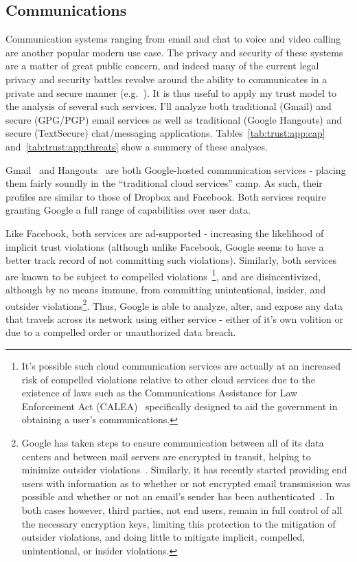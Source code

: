 \subsection{Communications}

Communication systems ranging from email and chat to voice and video
calling are another popular modern use case. The privacy and security
of these systems are a matter of great public concern, and indeed many
of the current legal privacy and security battles revolve around the
ability to communicates in a private and secure manner
(e.g.~\cite{apple-fbiletter, greenwald-prism, levsion-lavabit}). It is
thus useful to apply my trust model to the analysis of several such
services. I'll analyze both traditional (Gmail) and secure (GPG/PGP)
email services as well as traditional (Google Hangouts) and secure
(TextSecure) chat/messaging
applications. Tables~\ref{tab:trust:app:cap}
and~\ref{tab:trust:app:threats} show a summery of these analyses.

Gmail~\cite{google-gmail} and Hangouts~\cite{google-hangouts} are both
Google-hosted communication services - placing them fairly soundly in
the ``traditional cloud services'' camp. As such, their profiles are
similar to those of Dropbox and Facebook. Both services require
granting Google a full range of capabilities over user data.

Like Facebook, both services are ad-supported - increasing the
likelihood of implicit trust violations (although unlike Facebook,
Google seems to have a better track record of not committing such
violations). Similarly, both services are known to be subject to
compelled violations~\cite{google-transparency}\footnote{It's possible
  such cloud communication services are actually at an increased risk
  of compelled violations relative to other cloud services due to the
  existence of laws such as the Communications Assistance for Law
  Enforcement Act (CALEA)~\cite{calea-usc, calea-fcc} specifically
  designed to aid the government in obtaining a user's
  communications.}, and are disincentivized, although by no means
immune, from committing unintentional, insider, and outsider
violations\footnote{Google has taken steps to ensure communication
  between all of its data centers and between mail servers are
  encrypted in transit, helping to minimize outsider
  violations~\cite{gmail-blog-encryption}. Similarly, it has recently
  started providing end users with information as to whether or not
  encrypted email transmission was possible and whether or not an
  email's sender has been authenticated~\cite{gmail-blog-indicators}.
  In both cases however, third parties, not end users, remain in full
  control of all the necessary encryption keys, limiting this
  protection to the mitigation of outsider violations, and doing
  little to mitigate implicit, compelled, unintentional, or insider
  violations.}. Thus, Google is able to analyze, alter, and expose any
data that travels across its network using either service - either of
it's own volition or due to a compelled order or unauthorized data
breach.

